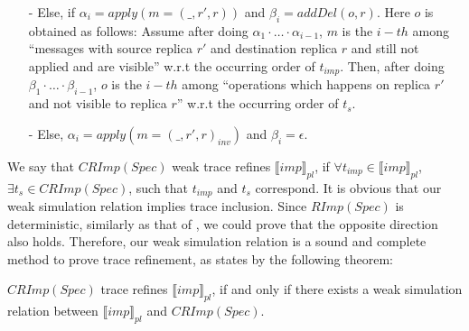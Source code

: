 {\begin{itemize}
\item[-] Else, if $\alpha_i = apply(m=(\_,r',r))$ and $\beta_i = addDel(o,r)$. Here $o$ is obtained as follows: Assume after doing $\alpha_1 \cdot \ldots \cdot \alpha_{i-1}$, $m$ is the $i-th$ among ``messages with source replica $r'$ and destination replica $r$ and still not applied and are visible'' w.r.t the occurring order of $t_{imp}$. Then, after doing $\beta_1 \cdot \ldots \cdot \beta_{i-1}$, $o$ is the $i-th$ among ``operations which happens on replica $r'$ and not visible to replica $r$'' w.r.t the occurring order of $t_s$.

\item[-] Else, $\alpha_i = apply(m=(\_,r',r)_{inv})$ and $\beta_i = \epsilon$.
\end{itemize}

We say that $CRImp(Spec)$ weak trace refines $\llbracket imp \rrbracket_{pl}$, if $\forall t_{imp} \in \llbracket imp \rrbracket_{pl}$, $\exists t_s \in CRImp(Spec)$, such that $t_{imp}$ and $t_s$ correspond. It is obvious that our weak simulation relation implies trace inclusion. Since $RImp(Spec)$ is deterministic, similarly as that of \cite{Abadi:1991,Lynch:1995}, we could prove that the opposite direction also holds. Therefore, our weak simulation relation is a sound and complete method to prove trace refinement, as states by the following theorem:

\begin{theorem}
\label{theorem:equivalence of our simulation relation and sequence inclusion for add-plus specification and its compacted reference implementation}
$CRImp(Spec)$ trace refines $\llbracket imp \rrbracket_{pl}$, if and only if there exists a weak simulation relation between $\llbracket imp \rrbracket_{pl}$ and $CRImp(Spec)$.
\end{theorem}
}

